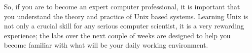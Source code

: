 So, if you are to become an expert computer professional, it is
important that you understand the theory and practice of Unix based
systems. Learning Unix is not only a crucial skill for any serious
computer scientist, it is a very rewarding experience; the labs over
the next couple of weeks are designed to help you become familiar with what will be your daily working environment.

